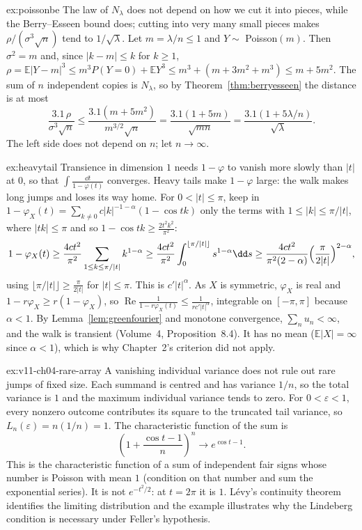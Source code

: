 \begin{solution}{ex:poissonbe}
\idea The law of $N_\lambda$ does not depend on how we cut it into pieces, while the Berry--Esseen bound does; cutting into very many small pieces makes
$\rho/(\sigma^3\sqrt n)$ tend to $1/\sqrt\lambda$.
\writeup Let $m=\lambda/n\le1$ and $Y\sim$ Poisson$(m)$. Then $\sigma^2=m$ and, since $|k-m|\le k$ for $k\ge1$,
$\rho=\mathbb E|Y-m|^3\le m^3P(Y=0)+\mathbb EY^3\le m^3+(m+3m^2+m^3)\le m+5m^2$. The sum of $n$ independent copies is $N_\lambda$, so by Theorem~\ref{thm:berryesseen}
the distance is at most
\[
\frac{3.1\,\rho}{\sigma^3\sqrt n}\le\frac{3.1(m+5m^2)}{m^{3/2}\sqrt n}=\frac{3.1(1+5m)}{\sqrt{mn}}=\frac{3.1(1+5\lambda/n)}{\sqrt\lambda}.
\]
The left side does not depend on $n$; let $n\to\infty$.
\end{solution}

\begin{solution}{ex:heavytail}
\idea Transience in dimension $1$ needs $1-\varphi$ to vanish more slowly than $|t|$ at $0$, so that $\int\frac{\dd t}{1-\varphi(t)}$ converges. Heavy tails make $1-\varphi$
large: the walk makes long jumps and loses its way home.
\writeup For $0<|t|\le\pi$, keep in $1-\varphi_X(t)=\sum_{k\ne0}c|k|^{-1-\alpha}(1-\cos tk)$ only the terms with $1\le|k|\le\pi/|t|$, where $|tk|\le\pi$ and so
$1-\cos tk\ge\frac{2t^2k^2}{\pi^2}$:
\[
1-\varphi_X(t)\ge\frac{4ct^2}{\pi^2}\sum_{1\le k\le\pi/|t|}k^{1-\alpha}\ge\frac{4ct^2}{\pi^2}\int_0^{\lfloor\pi/|t|\rfloor}s^{1-\alpha}\dd s
\ge\frac{4ct^2}{\pi^2(2-\alpha)}\Bigl(\frac\pi{2|t|}\Bigr)^{2-\alpha},
\]
using $\lfloor\pi/|t|\rfloor\ge\frac\pi{2|t|}$ for $|t|\le\pi$. This is $c'|t|^\alpha$. As $X$ is symmetric, $\varphi_X$ is real and $1-r\varphi_X\ge r(1-\varphi_X)$, so
$\operatorname{Re}\frac1{1-r\varphi_X(t)}\le\frac1{rc'|t|^\alpha}$, integrable on $[-\pi,\pi]$ because $\alpha<1$. By Lemma~\ref{lem:greenfourier} and monotone convergence,
$\sum_nu_n<\infty$, and the walk is transient (Volume~4, Proposition~8.4). It has no mean ($\mathbb E|X|=\infty$ since $\alpha<1$), which is why Chapter~2's
criterion did not apply.
\end{solution}

\begin{solution}{ex:v11-ch04-rare-array}
\idea A vanishing individual variance does not rule out rare jumps of fixed size.
\writeup Each summand is centred and has variance $1/n$, so the total variance is $1$ and the maximum individual variance tends to zero. For $0<\varepsilon<1$, every nonzero outcome contributes its square to the truncated tail variance, so $L_n(\varepsilon)=n(1/n)=1$. The characteristic function of the sum is
\[
\left(1+\frac{\cos t-1}{n}\right)^n\longrightarrow e^{\cos t-1}.
\]
This is the characteristic function of a sum of independent fair signs whose number is Poisson with mean $1$ (condition on that number and sum the exponential series). It is not $e^{-t^2/2}$: at $t=2\pi$ it is $1$. L\'evy's continuity theorem identifies the limiting distribution and the example illustrates why the Lindeberg condition is necessary under Feller's hypothesis.
\end{solution}

